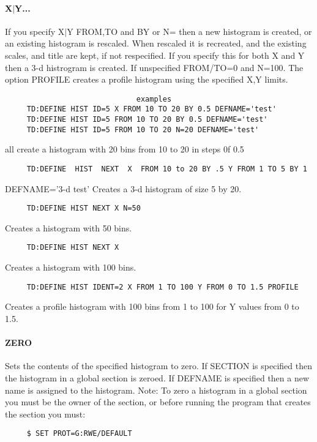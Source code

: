 \paragraph{X$|$Y...       }
If  you  specify  X$|$Y  FROM,TO  and  BY or N= then a new histogram is
created, or an existing histogram is rescaled.  When rescaled  it  is
recreated,  and  the  existing  scales,  and  title  are kept, if not
respecified.  If you specify this  for  both  X  and  Y  then  a  3-d
histrogram  is  created.   If  unspecified  FROM/TO=0 and N=100.  The
option PROFILE creates a profile histogram using  the  specified  X,Y
limits.  

\begin{verbatim}
                              examples
     TD:DEFINE HIST ID=5 X FROM 10 TO 20 BY 0.5 DEFNAME='test' 
     TD:DEFINE HIST ID=5 FROM 10 TO 20 BY 0.5 DEFNAME='test' 
     TD:DEFINE HIST ID=5 FROM 10 TO 20 N=20 DEFNAME='test' 
\end{verbatim}
all create a histogram with 20 bins from 10 to 20 in steps 0f 0.5 
\begin{verbatim}
     TD:DEFINE  HIST  NEXT  X  FROM 10 to 20 BY .5 Y FROM 1 TO 5 BY 1
\end{verbatim}
DEFNAME='3-d test' 
Creates a 3-d histogram of size 5 by 20.  
\begin{verbatim}
     TD:DEFINE HIST NEXT X N=50 
\end{verbatim}
Creates a histogram with 50 bins.  
\begin{verbatim}
     TD:DEFINE HIST NEXT X 
\end{verbatim}
Creates a histogram with 100 bins.  
\begin{verbatim}
     TD:DEFINE HIST IDENT=2 X FROM 1 TO 100 Y FROM 0 TO 1.5 PROFILE 
\end{verbatim}
Creates  a profile histogram with 100 bins from 1 to 100 for Y values
from 0 to 1.5.  
\paragraph{ZERO        }
Sets  the contents of the specified histogram to zero.  If SECTION is
specified then the histogram in  a  global  section  is  zeroed.   If
DEFNAME  is  specified  then a new name is assigned to the histogram.
Note:  To zero a histogram in a global section you must be the  owner
of  the  section,  or  before  running  the  program that creates the
section you must:  
\begin{verbatim}
     $ SET PROT=G:RWE/DEFAULT 
\end{verbatim}
